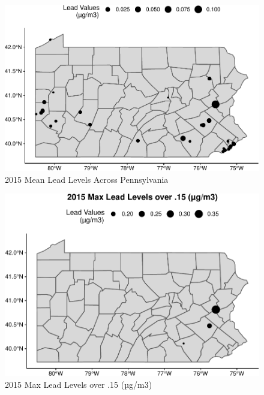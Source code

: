 \documentclass[
  12pt,
]{article}
\begin{document}
\begin{figure}
\centering
\includegraphics{Alcorn_Bao_Hermanson_ENV872_Project_files/figure-latex/spatial analysis 2015.5-1.pdf}
\caption{2015 Mean Lead Levels Across Pennsylvania}
\end{figure}

\begin{figure}
\centering
\includegraphics{Alcorn_Bao_Hermanson_ENV872_Project_files/figure-latex/spatial analysis 2015.6-1.pdf}
\caption{2015 Max Lead Levels over .15 (µg/m3)}
\end{figure}
\end{document}
